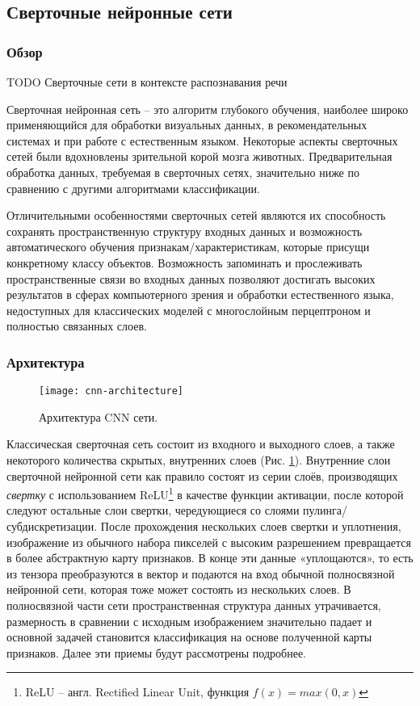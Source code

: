 \subsection{Сверточные нейронные сети}
\subsubsection{Обзор}
{\color{red} TODO Сверточные сети в контексте распознавания речи}


Сверточная нейронная сеть -- это алгоритм глубокого обучения, наиболее широко применяющийся для обработки визуальных данных, в рекомендательных системах\cite{cnn-recomendation-system} и при работе с естественным языком\cite{cnn-nlp}. Некоторые аспекты сверточных сетей были вдохновлены зрительной корой мозга животных\cite{cnn-neocognitron}. Предварительная обработка данных, требуемая в сверточных сетях, значительно ниже по сравнению с другими алгоритмами классификации.

Отличительными особенностями сверточных сетей являются их способность сохранять пространственную структуру входных данных и возможность автоматического обучения признакам/характеристикам, которые присущи конкретному классу объектов. Возможность запоминать и прослеживать пространственные связи во входных данных позволяют достигать высоких результатов в сферах компьютерного зрения и обработки естественного языка, недоступных для классических моделей с многослойным перцептроном и полностью связанных слоев.

\subsubsection{Архитектура}
\begin{figure}[h]
	\centering
	\texttt{[image: cnn-architecture]}
	\caption{Архитектура CNN сети.}
	\label{fig:cnn-architecture}
\end{figure}

Классическая сверточная сеть состоит из входного и выходного слоев, а также некоторого количества скрытых, внутренних слоев (Рис. \ref{fig:cnn-architecture}). Внутренние слои сверточной нейронной сети как правило состоят из серии слоёв, производящих \emph{свертку} с использованием ReLU\footnote{ReLU -- англ. Rectified Linear Unit, функция $f(x)=max(0,x)$} в качестве функции активации, после которой следуют остальные слои свертки, чередующиеся со слоями пулинга/субдискретизации. После прохождения нескольких слоев свертки и уплотнения, изображение из обычного набора пикселей с высоким разрешением превращается в более абстрактную карту признаков. В конце эти данные «уплощаются», то есть из тензора преобразуются в вектор и подаются на вход обычной полносвязной нейронной сети, которая тоже может состоять из нескольких слоев. В полносвязной части сети пространственная структура данных утрачивается, размерность в сравнении с исходным изображением значительно падает и основной задачей становится классификация на основе полученной карты признаков. Далее эти приемы будут рассмотрены подробнее.

